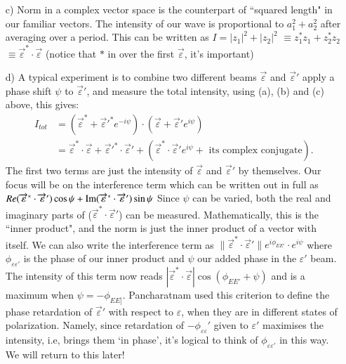 \begin{itemize}
\item[c)] Norm in a complex vector space is the counterpart of ``squared length" in
our familiar vectors. The intensity of our wave is proportional to $a_1^2 + a_2^2$ after
averaging over a period. This can be written as $I = | z_1 |^2 + | z_2 |^2$ $\equiv z^{\ast}_1 z_1 + z^{\ast}_2 z_2$ $\equiv \overrightarrow{\varepsilon}^{\ast} \cdot \overrightarrow{\varepsilon}$ (notice that $\ast$ in over the first $\overrightarrow{\varepsilon}$, it's important)

\item[d)] A typical experiment is to combine two different beams $\overrightarrow{\varepsilon}$ and $\overrightarrow{\varepsilon}'$ apply a phase
shift $\psi$ to $\overrightarrow{\varepsilon}'$, and measure the total intensity, using (a), (b) and (c) above, this
gives:
\begin{align*}
I_{tot} & = (\overrightarrow{\varepsilon}^{\ast} + \overrightarrow{\varepsilon}'^{\ast} e^{-i\psi})  \cdot (\overrightarrow{\varepsilon} + \overrightarrow{\varepsilon}' e^{i\psi})\\
& = \overrightarrow{\varepsilon}^{\ast} \cdot \overrightarrow{\varepsilon} + \overrightarrow{\varepsilon}'^{\ast}  \cdot \overrightarrow{\varepsilon}' + (\overrightarrow{\varepsilon}^{\ast} \cdot \overrightarrow{\varepsilon}' e^{i\psi}  + \text{ its complex conjugate}).
\end{align*}
The first two terms are just the intensity of $\overrightarrow{\varepsilon}$ and $\overrightarrow{\varepsilon}'$ by themselves. Our focus will be on the interference term which can be written out in full as $Re(\overrightarrow{\varepsilon}^{\ast}  \cdot \overrightarrow{\varepsilon}') \cos \psi + \operatorname{\mathrm{Im}} (\overrightarrow{\varepsilon}^{\ast} \cdot \overrightarrow{\varepsilon}') \sin \psi$
Since $\psi$ can be varied, both the real and imaginary parts of ($\overrightarrow{\varepsilon}^{\ast} \cdot \overrightarrow{\varepsilon}'$) can be
measured. Mathematically, this is the ``inner product", and the norm is just
the inner product of a vector with itself. We can also write the interference
term as $\| \overrightarrow{\varepsilon}^{\ast}  \cdot \overrightarrow{\varepsilon}'\| e^{i\phi_{EE'}} \cdot e^{i\psi}$ where $\phi_{\varepsilon \varepsilon'}$ is the phase of our inner product and $\psi$ our added phase in the $\varepsilon'$ beam. The intensity of this term now reads
$| \overrightarrow{\varepsilon}^{\ast} \cdot \overrightarrow{\varepsilon}| \cos (\phi_{EE'} + \psi)$ and is a maximum when $\psi = -\phi_{EE]}$. Pancharatnam
used this criterion to define the phase retardation of $\overrightarrow{\varepsilon}'$ with respect to $\varepsilon$, when
they are in different states of polarization. Namely, since retardation of $-\phi_{\varepsilon \varepsilon}'$ 
given to $\varepsilon'$ maximises the intensity, i.e, brings them `in phase', it's logical to
think of $\phi_{\varepsilon \varepsilon'}$ in this way. We will return to this later!


\end{itemize}
